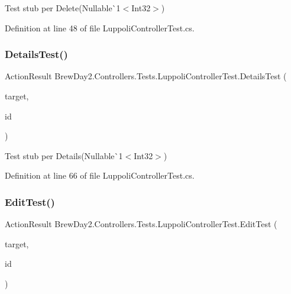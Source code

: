 Test stub per Delete(Nullable\`{}1$<$Int32$>$)



Definition at line 48 of file Luppoli\+Controller\+Test.\+cs.

\mbox{\label{class_brew_day2_1_1_controllers_1_1_tests_1_1_luppoli_controller_test_a9feeabe58f9a429fc08b9242abe988da}} 
\subsubsection{\texorpdfstring{Details\+Test()}{DetailsTest()}}
{\footnotesize\ttfamily Action\+Result Brew\+Day2.\+Controllers.\+Tests.\+Luppoli\+Controller\+Test.\+Details\+Test (\begin{DoxyParamCaption}\item[{\mbox{[}\+Pex\+Assume\+Under\+Test\mbox{]} \mbox{\hyperlink{class_brew_day2_1_1_controllers_1_1_luppoli_controller}{Luppoli\+Controller}}}]{target,  }\item[{int?}]{id }\end{DoxyParamCaption})}



Test stub per Details(Nullable\`{}1$<$Int32$>$)



Definition at line 66 of file Luppoli\+Controller\+Test.\+cs.

\mbox{\label{class_brew_day2_1_1_controllers_1_1_tests_1_1_luppoli_controller_test_a67cdff824b5a22e14ae77b31a08cfc5e}} 
\subsubsection{\texorpdfstring{Edit\+Test()}{EditTest()}}
{\footnotesize\ttfamily Action\+Result Brew\+Day2.\+Controllers.\+Tests.\+Luppoli\+Controller\+Test.\+Edit\+Test (\begin{DoxyParamCaption}\item[{\mbox{[}\+Pex\+Assume\+Under\+Test\mbox{]} \mbox{\hyperlink{class_brew_day2_1_1_controllers_1_1_luppoli_controller}{Luppoli\+Controller}}}]{target,  }\item[{int?}]{id }\end{DoxyParamCaption})}



